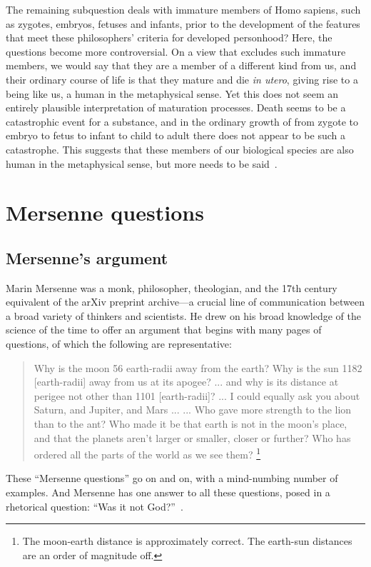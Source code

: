 The remaining subquestion deals with immature members of Homo sapiens, such as zygotes, embryos, fetuses and infants, prior to the
development of the features that meet these philosophers' criteria for developed personhood? Here, the questions become 
more controversial.
On a view that excludes such immature members, we would say that they are a member of a different kind from us, and
their ordinary course of life is that they mature and die \textit{in utero}, giving
rise to a being like us, a human in the metaphysical sense. Yet this does not seem an entirely plausible
interpretation of maturation processes. Death seems to be a catastrophic event for a substance, and in the ordinary
growth of from zygote to embryo to fetus to infant to child to adult 
there does not appear to be such a catastrophe. This suggests that these members of our biological species are also human in the metaphysical sense, but more needs to be said~\parencite{PrussAbortion, ColgroveZygotes}.

\section{Mersenne questions}
\subsection{Mersenne's argument}
Marin Mersenne was a monk, philosopher, theologian, and the 17th century equivalent of the arXiv preprint 
archive---a crucial line of communication between a broad variety of thinkers and scientists. He drew on his broad knowledge of
the science of the time to offer an argument that begins with many pages of questions, of which the following are
representative:
\begin{quote}
Why is the moon 56 earth-radii away from the earth? Why is the sun 1182 [earth-radii] away from us at its apogee? ... and why is its distance at perigee not other than 1101 [earth-radii]? ...
I could equally ask you about Saturn, and Jupiter, and Mars ... 
...
Who gave more strength to the lion than to the ant?
Who made it be that earth is not in the moon's place, and that the planets aren't larger or smaller, closer or further?
Who has ordered all the parts of the world as we see them?
\parencite[pp.~97--98,282--283]{MersenneImpiety}\footnote{The moon-earth distance is approximately correct. The earth-sun distances are an order of magnitude off.}
\end{quote}
These ``Mersenne questions'' go on and on, with a mind-numbing number of examples. And Mersenne has one answer to all
these questions, posed in a rhetorical question: ``Was it not God?''~\parencite[p.~283]{MersenneImpiety}.


